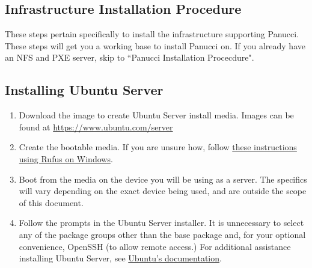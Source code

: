 \documentclass{article}
\begin{document}
\begin{flushleft}
\pagebreak
\section{Infrastructure Installation Procedure}
These steps pertain specifically to install the infrastructure supporting Panucci.  These steps will get you a working base to install Panucci on.  If you already have an NFS and PXE server, skip to ``Panucci Installation Procecdure".
\subsection{Installing Ubuntu Server}
\begin{enumerate}
  \item Download the image to create Ubuntu Server install media.  Images can be found at \url{https://www.ubuntu.com/server}
  \item Create the bootable media.  If you are unsure how, follow \href{https://www.ubuntu.com/download/desktop/create-a-usb-stick-on-windows}{these instructions using Rufus on Windows}.
  \item Boot from the media on the device you will be using as a server.  The specifics will vary depending on the exact device being used, and are outside the scope of this document.
  \item Follow the prompts in the Ubuntu Server installer.  It is unnecessary to select any of the package groups other than the base package and, for your optional convenience, OpenSSH (to allow remote access.)  For additional assistance installing Ubuntu Server, see \href{https://www.ubuntu.com/download/server/install-ubuntu-server}{Ubuntu's documentation}.
\end{enumerate}

\end{flushleft}
\end{document}
